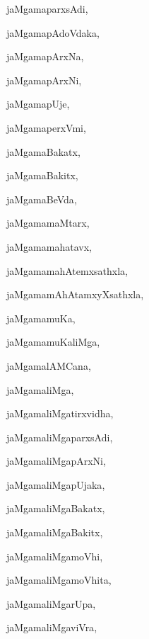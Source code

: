 \begin{multicols}{3}
{\noindent
{jaMgamaparxsAdi}, \pageref{jaMgamaparxsAdi}

\noindent
{jaMgamapAdoVdaka}, \pageref{jaMgamapAdoVdaka}

\noindent
{jaMgamapArxNa}, \pageref{jaMgamapArxNa}

\noindent
{jaMgamapArxNi}, \pageref{jaMgamapArxNi}

\noindent
{jaMgamapUje}, \pageref{jaMgamapUje}

\noindent
{jaMgamaperxVmi}, \pageref{jaMgamaperxVmi}

\noindent
{jaMgamaBakatx}, \pageref{jaMgamaBakatx}

\noindent
{jaMgamaBakitx}, \pageref{jaMgamaBakitx}

\noindent
{jaMgamaBeVda}, \pageref{jaMgamaBeVda}

\noindent
{jaMgamamaMtarx}, \pageref{jaMgamamaMtarx}

\noindent
{jaMgamamahatavx}, \pageref{jaMgamamahatavx}

\noindent
{jaMgamamahAtemxsathxla}, \pageref{jaMgamamahAtemxsathxla}

\noindent
{jaMgamamAhAtamxyXsathxla}, \pageref{jaMgamamAhAtamxyXsathxla}

\noindent
{jaMgamamuKa}, \pageref{jaMgamamuKa}

\noindent
{jaMgamamuKaliMga}, \pageref{jaMgamamuKaliMga}

\noindent
{jaMgamalAMCana}, \pageref{jaMgamalAMCana}

\noindent
{jaMgamaliMga}, \pageref{jaMgamaliMga}

\noindent
{jaMgamaliMgatirxvidha}, \pageref{jaMgamaliMgatirxvidha}

\noindent
{jaMgamaliMgaparxsAdi}, \pageref{jaMgamaliMgaparxsAdi}

\noindent
{jaMgamaliMgapArxNi}, \pageref{jaMgamaliMgapArxNi}

\noindent
{jaMgamaliMgapUjaka}, \pageref{jaMgamaliMgapUjaka}

\noindent
{jaMgamaliMgaBakatx}, \pageref{jaMgamaliMgaBakatx}

\noindent
{jaMgamaliMgaBakitx}, \pageref{jaMgamaliMgaBakitx}

\noindent
{jaMgamaliMgamoVhi}, \pageref{jaMgamaliMgamoVhi}

\noindent
{jaMgamaliMgamoVhita}, \pageref{jaMgamaliMgamoVhita}

\noindent
{jaMgamaliMgarUpa}, \pageref{jaMgamaliMgarUpa}

\noindent
{jaMgamaliMgaviVra}, \pageref{jaMgamaliMgaviVra}

}
\end{multicols}
